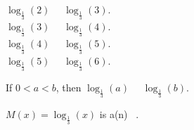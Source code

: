 \documentclass{ximera}
\begin{document}
\begin{example}
\begin{question}
$\log_{\tfrac{1}{3}}(2)$ \, \wordChoice{\choice{$<$} \choice[correct]{$>$}} \, $\log_{\tfrac{1}{3}}(3)$.  \\

$\log_{\tfrac{1}{3}}(3)$ \, \wordChoice{\choice{$<$} \choice[correct]{$>$}} \, $\log_{\tfrac{1}{3}}(4)$.  \\

$\log_{\tfrac{1}{3}}(4)$ \, \wordChoice{\choice{$<$} \choice[correct]{$>$}} \, $\log_{\tfrac{1}{3}}(5)$.  \\

$\log_{\tfrac{1}{3}}(5)$ \, \wordChoice{\choice{$<$} \choice[correct]{$>$}} \, $\log_{\tfrac{1}{3}}(6)$.  \\


\end{question}




\begin{question}



If $0 < a < b$, then $\log_{\tfrac{1}{3}}(a)$ \, \wordChoice{\choice{$<$} \choice[correct]{$>$}} \, $\log_{\tfrac{1}{3}}(b)$.  \\



\end{question}





\begin{question}



$M(x) = \log_{\tfrac{1}{3}}(x)$  is a(n) \,  .  \\



\end{question}








\end{example}
\end{document}
